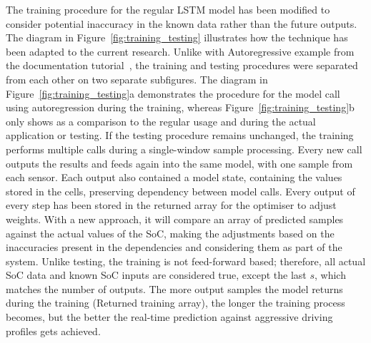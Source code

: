%
%
{The} training procedure for the regular LSTM model has been modified to consider potential inaccuracy in the known data rather than the future outputs.
The diagram in Figure~\ref{fig:training_testing} illustrates how the technique has been adapted to the current research.
{Unlike with Autoregressive example from the documentation tutorial~\cite{time_2020}, the training and testing procedures were separated from each other on two separate subfigures.}
The diagram in \mbox{Figure~\ref{fig:training_testing}a} demonstrates the procedure for the model call using autoregression during the training, whereas \mbox{Figure~\ref{fig:training_testing}b} only shows as a comparison to the regular usage and during the actual application or testing.
If the testing procedure remains unchanged, the training performs multiple calls during a single-window sample processing.
Every new call outputs the results and feeds again into the same model, with one sample from each sensor.
Each output also contained a model state, containing the values stored in the cells, preserving dependency between model calls.
Every output of every step has been stored in the returned array for the optimiser to adjust weights.
With a new approach, it will compare an array of predicted samples against the actual values of the SoC, making the adjustments based on the inaccuracies present in the dependencies and considering them as part of the system.
Unlike testing, the training is not feed-forward based; therefore, all actual SoC data and known SoC inputs are considered true, except the last $s$, which matches the number of outputs.
The more output samples the model returns during the training (Returned training array), the longer the training process becomes, but the better the real-time prediction against aggressive driving profiles gets achieved.
